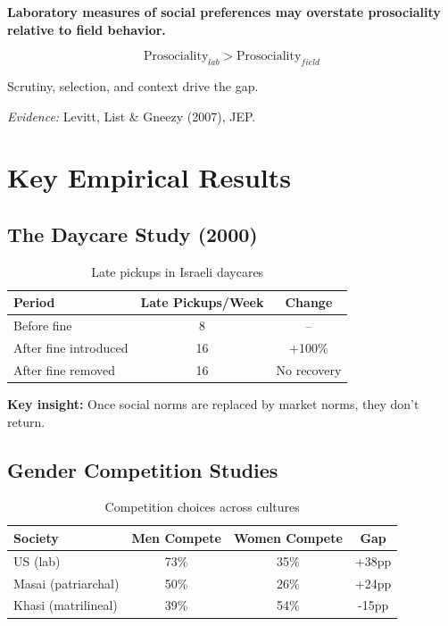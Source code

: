 \begin{tcolorbox}[colback=red!5!white,colframe=red!75!black,title=Axiom GN-6: Lab-Field Gap]
\textbf{Laboratory measures of social preferences may overstate prosociality relative to field behavior.}

\begin{equation}
\text{Prosociality}_{lab} > \text{Prosociality}_{field}
\end{equation}

Scrutiny, selection, and context drive the gap.

\textit{Evidence:} Levitt, List \& Gneezy (2007), JEP.
\end{tcolorbox}

\section{Key Empirical Results}

\subsection{The Daycare Study (2000)}

\begin{table}[h]
\centering
\begin{tabular}{lcc}
\hline
\textbf{Period} & \textbf{Late Pickups/Week} & \textbf{Change} \\
\hline
Before fine & 8 & -- \\
After fine introduced & 16 & +100\% \\
After fine removed & 16 & No recovery \\
\hline
\end{tabular}
\caption{Late pickups in Israeli daycares}
\end{table}

\textbf{Key insight:} Once social norms are replaced by market norms, they don't return.

\subsection{Gender Competition Studies}

\begin{table}[h]
\centering
\begin{tabular}{lccc}
\hline
\textbf{Society} & \textbf{Men Compete} & \textbf{Women Compete} & \textbf{Gap} \\
\hline
US (lab) & 73\% & 35\% & +38pp \\
Masai (patriarchal) & 50\% & 26\% & +24pp \\
Khasi (matrilineal) & 39\% & 54\% & -15pp \\
\hline
\end{tabular}
\caption{Competition choices across cultures}
\end{table}

